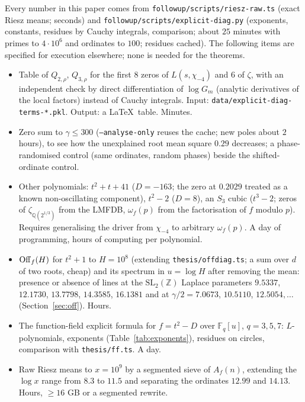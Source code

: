 \documentclass[11pt,a4paper]{article}
\theoremstyle{remark}\newtheorem{remark}[theorem]{Remark}
\newcommand{\Z}{\mathbb{Z}}\newcommand{\Q}{\mathbb{Q}}\newcommand{\F}{\mathbb{F}}\newcommand{\C}{\mathbb{C}}
\begin{document}
Every number in this paper comes from \texttt{followup/scripts/riesz-raw.ts} (exact Riesz means; seconds)
and \texttt{followup/scripts/explicit-diag.py} (exponents, constants, residues by Cauchy integrals,
comparison; about $25$ minutes with primes to $4\cdot10^6$ and ordinates to $100$; residues cached). The
following items are specified for execution elsewhere; none is needed for the theorems.
\begin{itemize}
\item[(C1)] Table of $Q_{2,\rho}$, $Q_{3,\rho}$ for the first $8$ zeros of $L(s,\chi_{-4})$ and $6$ of $\zeta$, with an
independent check by direct differentiation of $\log G_m$ (analytic derivatives of the local factors) instead
of Cauchy integrals. Input: \texttt{data/explicit-diag-terms-*.pkl}. Output: a \LaTeX\ table. Minutes.
\item[(C2)] Zero sum to $\gamma\le300$ (\texttt{--analyse-only} reuses the cache; new poles about $2$ hours), to
see how the unexplained root mean square $0.29$ decreases; a phase-randomised control (same ordinates,
random phases) beside the shifted-ordinate control.
\item[(C3)] Other polynomials: $t^2+t+41$ ($D=-163$; the zero at $0.2029$ treated as a known non-oscillating
component), $t^2-2$ ($D=8$), an $S_3$ cubic ($t^3-2$; zeros of $\zeta_{\Q(2^{1/3})}$ from the LMFDB, $\omega_f(p)$
from the factorisation of $f$ modulo $p$). Requires generalising the driver from $\chi_{-4}$ to arbitrary
$\omega_f(p)$. A day of programming, hours of computing per polynomial.
\item[(C4)] $\mathrm{Off}_f(H)$ for $t^2+1$ to $H=10^8$ (extending \texttt{thesis/offdiag.ts}; a sum over $d$ of two
roots, cheap) and its spectrum in $u=\log H$ after removing the mean: presence or absence of lines at the
$\mathrm{SL}_2(\Z)$ Laplace parameters $9.5337$, $12.1730$, $13.7798$, $14.3585$, $16.1381$ and at
$\gamma/2=7.0673$, $10.5110$, $12.5054,\dots$ (Section~\ref{sec:off}). Hours.
\item[(C5)] The function-field explicit formula for $f=t^2-D$ over $\F_q[u]$, $q=3,5,7$: $L$-polynomials,
exponents (Table~\ref{tab:exponents}), residues on circles, comparison with \texttt{thesis/ff.ts}. A day.
\item[(C6)] Raw Riesz means to $x=10^9$ by a segmented sieve of $A_f(n)$, extending the $\log x$ range from
$8.3$ to $11.5$ and separating the ordinates $12.99$ and $14.13$. Hours, $\ge16$ GB or a segmented rewrite.
\end{itemize}
\end{document}
